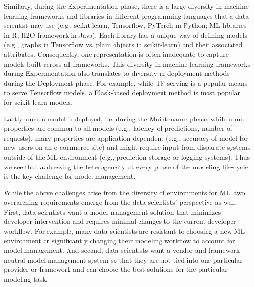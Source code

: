 \documentclass[11pt]{article}
\newcommand{\dss}{data scientists\xspace}
\newcommand{\ds}{data scientist\xspace}
\begin{document}
Similarly, during the Experimentation phase, there is a large diversity in machine learning frameworks and libraries in different programming languages that a \ds may use (e.g., scikit-learn, Tensorflow, PyTorch in Python; ML libraries in R; H2O framework in Java).
Each library has a unique way of defining models (e.g., graphs in Tensorflow vs. plain objects in scikit-learn) and their associated attributes.
Consequently, one representation is often inadequate to capture models built across all frameworks.
This diversity in machine learning frameworks during Experimentation also translates to diversity in deployment methods during the Deployment phase.
For example, while TF-serving is a popular means to serve Tensorflow models, a Flask-based deployment method is most popular for scikit-learn models.

Lastly, once a model is deployed, i.e. during the Maintenance phase, while some properties are common to all models (e.g., latency of predictions, number of requests), many properties are application dependent (e.g., accuracy of model for new users on an e-commerce site) and might require input from disparate systems outside of the ML environment (e.g., prediction storage or logging systems).
Thus we see that addressing the heterogeneity at every phase of the modeling life-cycle is the key challenge for model management.


While the above challenges arise from the diversity of environments for ML, two overarching requirements emerge from the data scientists' perspective as well.
First, \dss want a model management solution that minimizes developer intervention and requires minimal changes to the current developer workflow.
For example, many \dss are resistant to choosing a new ML environment or significantly changing their modeling workflow to account for model management.
And second, \dss want a vendor and framework-neutral model management system so that they are not tied into one particular provider or framework and can choose the best solutions for the particular modeling task.
\end{document}
